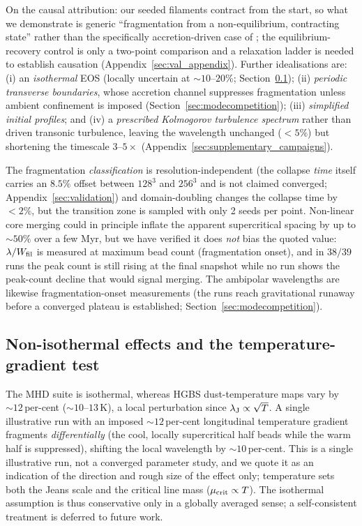 \documentclass[usenatbib,twoside,twocolumn]{mnras}
\begin{document}
On the causal attribution: our seeded filaments contract from the start, so what we demonstrate is generic ``fragmentation from a non-equilibrium, contracting state'' rather than the specifically accretion-driven case of \citet{Clarke2016,Clarke2017}; the equilibrium-recovery control is only a two-point comparison and a relaxation ladder is needed to establish causation (Appendix~\ref{sec:val_appendix}). Further idealisations are: (i) an \emph{isothermal} EOS (locally uncertain at $\sim10$--$20\%$; Section~\ref{sec:mt_variation}); (ii) \emph{periodic transverse boundaries}, whose accretion channel suppresses fragmentation unless ambient confinement is imposed (Section~\ref{sec:modecompetition}); (iii) \emph{simplified initial profiles}; and (iv) a \emph{prescribed Kolmogorov turbulence spectrum} rather than driven transonic turbulence, leaving the wavelength unchanged ($<5\%$) but shortening the timescale $3$--$5\times$ (Appendix~\ref{sec:supplementary_campaigns}).

The fragmentation \emph{classification} is resolution-independent (the collapse \emph{time} itself carries an $8.5\%$ offset between $128^3$ and $256^3$ and is not claimed converged; Appendix~\ref{sec:validation}) and domain-doubling changes the collapse time by $<2\%$, but the transition zone is sampled with only 2 seeds per point. Non-linear core merging could in principle inflate the apparent supercritical spacing by up to $\sim50\%$ over a few Myr, but we have verified it does \emph{not} bias the quoted value: $\lambda/W_{\rm fil}$ is measured at maximum bead count (fragmentation onset), and in $38/39$ runs the peak count is still rising at the final snapshot while no run shows the peak-count decline that would signal merging. The ambipolar wavelengths are likewise fragmentation-onset measurements (the runs reach gravitational runaway before a converged plateau is established; Section~\ref{sec:modecompetition}).

\subsection{Non-isothermal effects and the temperature-gradient test}
\label{sec:mt_variation}

The MHD suite is isothermal, whereas HGBS dust-temperature maps vary by $\sim12$\,per-cent ($\sim10$--$13$\,K), a local perturbation since $\lambda_{\rm J}\propto\sqrt{T}$. A single illustrative run with an imposed $\sim12$\,per-cent longitudinal temperature gradient fragments \emph{differentially} (the cool, locally supercritical half beads while the warm half is suppressed), shifting the local wavelength by $\sim10$\,per-cent. This is a single illustrative run, not a converged parameter study, and we quote it as an indication of the direction and rough size of the effect only; temperature sets both the Jeans scale and the critical line mass ($\mu_{\rm crit}\propto T$). The isothermal assumption is thus conservative only in a globally averaged sense; a self-consistent treatment is deferred to future work.
\end{document}
